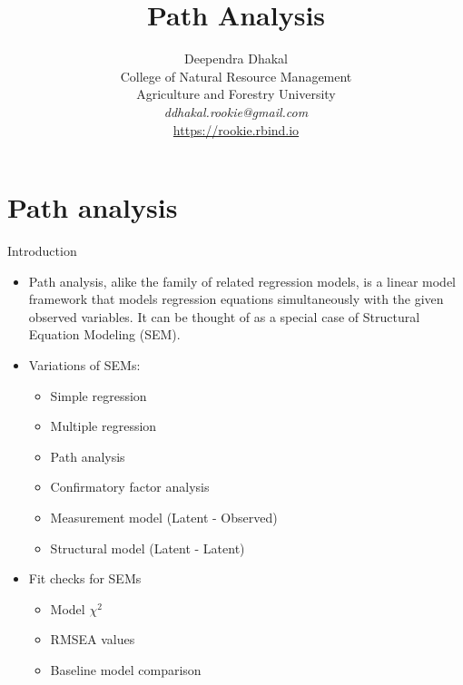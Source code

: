 \documentclass[11pt,dvipsnames,ignorenonframetext,aspectratio=169]{beamer}
\title[]{Path Analysis}
\author[
        Deependra Dhakal\\
College of Natural Resource Management\\
Agriculture and Forestry University\\
\textit{ddhakal.rookie@gmail.com}\\
\url{https://rookie.rbind.io}
    ]{Deependra Dhakal\\
College of Natural Resource Management\\
Agriculture and Forestry University\\
\textit{ddhakal.rookie@gmail.com}\\
\url{https://rookie.rbind.io}}
\date[
      
  ]{
    }
\providecommand{\tightlist}{%
  \setlength{\itemsep}{0pt}\setlength{\parskip}{0pt}}
\begin{document}
  \begin{frame}[plain]
  \titlepage
  \end{frame}



\hypertarget{path-analysis}{%
\section{Path analysis}\label{path-analysis}}

\begin{frame}{Introduction}
\protect\hypertarget{introduction}{}
\begin{itemize}
\tightlist
\item
  Path analysis, alike the family of related regression models, is a
  linear model framework that models regression equations simultaneously
  with the given observed variables. It can be thought of as a special
  case of Structural Equation Modeling (SEM).
\item
  Variations of SEMs:

  \begin{itemize}
  \tightlist
  \item
    Simple regression
  \item
    Multiple regression
  \item
    Path analysis
  \item
    Confirmatory factor analysis
  \item
    Measurement model (Latent - Observed)
  \item
    Structural model (Latent - Latent)
  \end{itemize}
\item
  Fit checks for SEMs

  \begin{itemize}
  \tightlist
  \item
    Model \(\chi^2\)
  \item
    RMSEA values
  \item
    Baseline model comparison
  \end{itemize}
\end{itemize}
\end{frame}
\end{document}
